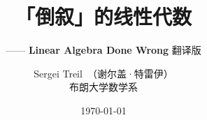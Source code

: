 \documentclass[openany,twoside,zihao=-4,,fontset=windows]{zhbook}
\title{「倒叙」的线性代数}  %
\subtitle{——\textbf{{\tinro
Linear Algebra
Done Wrong}} 翻译版}  %
\author{Sergei Treil~（谢尔盖·特雷伊）\\ 布朗大学数学系 }  %
\date{\today}  %
\begin{document}
\maketitle

%



\frontmatter





%


%


\maketoc




% 



\mainmatter







% 


% 


% 


% 


% 


% 


% 


% 




% 
\end{document}
